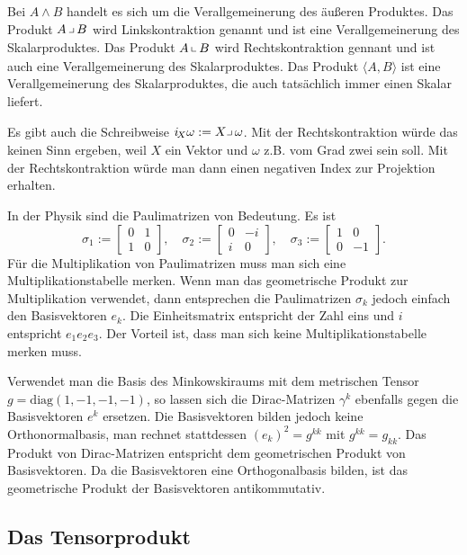 \documentclass[a4paper,10pt,fleqn,twocolumn,twoside]{article}
\begin{document}
Bei \(A\wedge B\) handelt es sich um die Verallgemeinerung des
äußeren Produktes.
Das Produkt \(A\,\big\lrcorner\,B\) wird Linkskontraktion genannt
und ist eine Verallgemeinerung des Skalarproduktes.
Das Produkt \(A\,\big\llcorner\,B\) wird Rechtskontraktion gennant
und ist auch eine Verallgemeinerung des Skalarproduktes.
Das Produkt \(\langle A,B\rangle\) ist eine Verallgemeinerung des
Skalarproduktes, die auch tatsächlich immer einen Skalar liefert.

Es gibt auch die Schreibweise
\(i_{\!X} \omega := X\big\lrcorner\,\omega\). Mit der
Rechtskontraktion würde das keinen Sinn ergeben, weil \(X\) ein
Vektor und \(\omega\) z.B. vom Grad zwei sein soll. Mit der
Rechtskontraktion würde man dann einen negativen Index zur
Projektion erhalten.

In der Physik sind die Paulimatrizen von Bedeutung. Es ist
\[
\sigma_1 := \begin{bmatrix}0 & 1\\ 1 & 0\end{bmatrix},\quad
\sigma_2 := \begin{bmatrix}0 & -i\\ i & 0\end{bmatrix},\quad
\sigma_3 := \begin{bmatrix}1 & 0\\ 0 & -1\end{bmatrix}.
\]
Für die Multiplikation von Paulimatrizen muss man sich
eine Multiplikationstabelle merken. Wenn man das geometrische
Produkt zur Multiplikation verwendet, dann entsprechen
die Paulimatrizen \(\sigma_k\) jedoch einfach den
Basisvektoren \(e_k\). Die Einheitsmatrix entspricht der Zahl eins
und \(i\) entspricht \(e_1e_2e_3\). Der Vorteil ist,
dass man sich keine Multiplikationstabelle merken muss.

Verwendet man die Basis des Minkowskiraums mit dem metrischen Tensor
\(g=\mathrm{diag}(1,-1,-1,-1)\), so lassen sich die Dirac-Matrizen
\(\gamma^k\) ebenfalls gegen die Basisvektoren \(e^k\) ersetzen.
Die Basisvektoren bilden jedoch keine Orthonormalbasis, man rechnet
stattdessen \((e_k)^2=g^{kk}\) mit \(g^{kk}=g_{kk}\). Das Produkt
von Dirac-Matrizen entspricht dem geometrischen Produkt von
Basisvektoren. Da die Basisvektoren eine Orthogonalbasis bilden,
ist das geometrische Produkt der Basisvektoren antikommutativ.


\subsection{Das Tensorprodukt}
\end{document}
